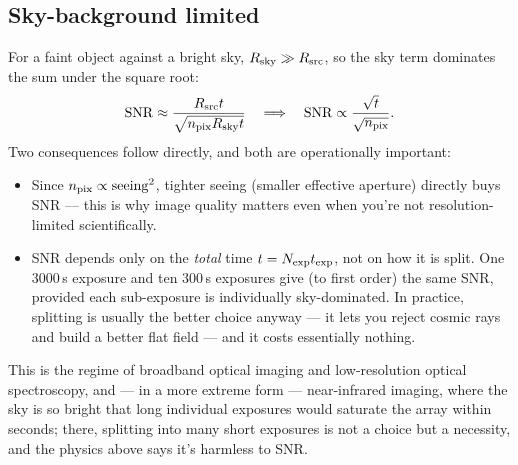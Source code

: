 \documentclass[11pt]{article}
\newcommand{\regime}[1]{\subsection*{#1}}
\begin{document}
\regime{Sky-background limited}
For a faint object against a bright sky, $R_{\rm sky}\gg R_{\rm src}$, so the sky term dominates the
sum under the square root:
\begin{equation}
\mathrm{SNR} \approx \frac{R_{\rm src}t}{\sqrt{n_{\rm pix}R_{\rm sky}t}}
\quad\Longrightarrow\quad \mathrm{SNR}\propto\frac{\sqrt{t}}{\sqrt{n_{\rm pix}}}.
\end{equation}
Two consequences follow directly, and both are operationally important:
\begin{itemize}
\item Since $n_{\rm pix}\propto\mathrm{seeing}^2$, tighter seeing (smaller effective aperture) directly
buys SNR --- this is why image quality matters even when you're not resolution-limited scientifically.
\item SNR depends only on the \emph{total} time $t=N_{\rm exp}t_{\rm exp}$, not on how it is split. One
3000\,s exposure and ten 300\,s exposures give (to first order) the same SNR, provided each
sub-exposure is individually sky-dominated. In practice, splitting is usually the better choice anyway
--- it lets you reject cosmic rays and build a better flat field --- and it costs essentially nothing.
\end{itemize}
This is the regime of broadband optical imaging and low-resolution optical spectroscopy, and --- in a
more extreme form --- near-infrared imaging, where the sky is so bright that long individual exposures
would saturate the array within seconds; there, splitting into many short exposures is not a choice
but a necessity, and the physics above says it's harmless to SNR.
\end{document}

